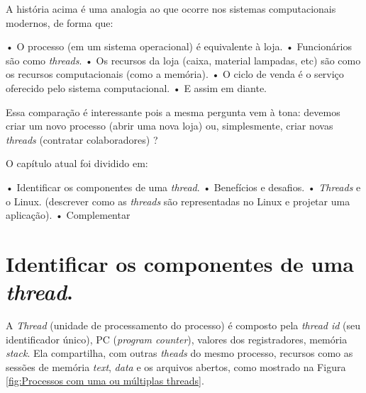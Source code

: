 A história acima é uma analogia ao que ocorre nos sistemas
computacionais modernos, de forma que:

• O processo (em um sistema operacional) é equivalente à loja. •
Funcionários são como \emph{threads}. • Os recursos da loja (caixa,
material lampadas, etc) são como os recursos computacionais (como a
memória). • O ciclo de venda é o serviço oferecido pelo sistema
computacional. • E assim em diante.

Essa comparação é interessante pois a mesma pergunta vem à tona: devemos
criar um novo processo (abrir uma nova loja) ou, simplesmente, criar
novas \emph{threads} (contratar colaboradores) ?

O capítulo atual foi dividido em:

• Identificar os componentes de uma \emph{thread}. • Benefícios e
desafios. • \emph{Threads} e o Linux. (descrever como as \emph{threads}
são representadas no Linux e projetar uma aplicação). • Complementar

\hypertarget{identificar-os-componentes-de-uma-thread.}{%
\section{\texorpdfstring{Identificar os componentes de uma
\emph{thread}.}{Identificar os componentes de uma thread.}}\label{identificar-os-componentes-de-uma-thread.}}

A \emph{Thread} (unidade de processamento do processo) é composto pela
\emph{thread id} (seu identificador único), PC (\emph{program counter}),
valores dos registradores, memória \emph{stack}. Ela compartilha, com
outras \emph{theads} do mesmo processo, recursos como as sessões de
memória \emph{text}, \emph{data} e os arquivos abertos, como mostrado na
Figura \ref{fig:Processos com uma ou múltiplas threads}.


